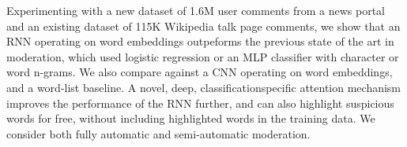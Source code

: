 Experimenting with a new dataset of 1.6M user comments from a news portal and an existing dataset of 115K Wikipedia talk page comments, we show that an RNN operating on word embeddings outpeforms the previous state of the art in moderation, which used logistic regression or an MLP classifier with character or word n-grams. We also compare against a CNN operating on word embeddings, and a word-list baseline. A novel, deep, classificationspecific attention mechanism improves the performance of the RNN further, and can also highlight suspicious words for free, without including highlighted words in the training data. We consider both fully automatic and semi-automatic moderation.

